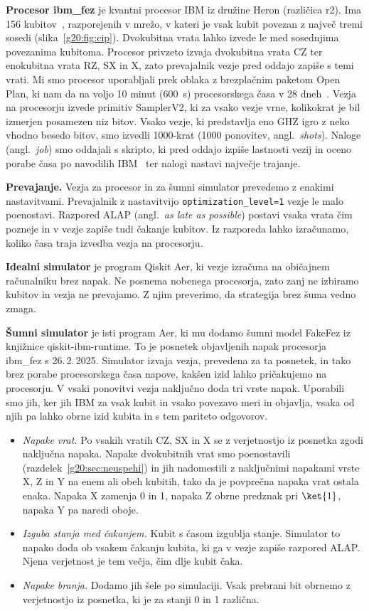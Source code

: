 \textbf{Procesor ibm\_fez} je kvantni procesor IBM iz družine Heron (različica r2). Ima 156 kubitov~\cite{g20:ibmprocessors}, razporejenih v mrežo, v kateri je vsak kubit povezan z največ tremi sosedi (slika~\ref{g20:fig:cip}). Dvokubitna vrata lahko izvede le med sosednjima povezanima kubitoma. Procesor privzeto izvaja dvokubitna vrata CZ ter enokubitna vrata RZ, SX in X, zato prevajalnik vezje pred oddajo zapiše s temi vrati. Mi smo procesor uporabljali prek oblaka z brezplačnim paketom Open Plan, ki nam da na voljo 10 minut (600~s) procesorskega časa v 28 dneh~\cite{g20:ibmplan}. Vezja na procesorju izvede primitiv SamplerV2, ki za vsako vezje vrne, kolikokrat je bil izmerjen posamezen niz bitov. Vsako vezje, ki predstavlja eno GHZ igro z neko vhodno besedo bitov, smo izvedli 1000-krat (1000 ponovitev, angl.\ \emph{shots}). Naloge (angl.\ \emph{job}) smo oddajali s skripto, ki pred oddajo izpiše lastnosti vezij in oceno porabe časa po navodilih IBM~\cite{g20:ibmjobtime} ter nalogi nastavi največje trajanje.

\textbf{Prevajanje.} Vezja za procesor in za šumni simulator prevedemo z enakimi nastavitvami. Prevajalnik z nastavitvijo \texttt{optimization\_level=1} vezje le malo poenostavi. Razpored ALAP (angl.\ \emph{as late as possible}) postavi vsaka vrata čim pozneje in v vezje zapiše tudi čakanje kubitov. Iz razporeda lahko izračunamo, koliko časa traja izvedba vezja na procesorju.

\textbf{Idealni simulator} je program Qiskit Aer, ki vezje izračuna na običajnem računalniku brez napak. Ne posnema nobenega procesorja, zato zanj ne izbiramo kubitov in vezja ne prevajamo. Z njim preverimo, da strategija brez šuma vedno zmaga.

\textbf{Šumni simulator} je isti program Aer, ki mu dodamo šumni model FakeFez iz knjižnice qiskit-ibm-runtime. To je posnetek objavljenih napak procesorja ibm\_fez s 26.\,2.\,2025. Simulator izvaja vezja, prevedena za ta posnetek, in tako brez porabe procesorskega časa napove, kakšen izid lahko pričakujemo na procesorju. V vsaki ponovitvi vezja naključno doda tri vrste napak. Uporabili smo jih, ker jih IBM za vsak kubit in vsako povezavo meri in objavlja, vsaka od njih pa lahko obrne izid kubita in s tem pariteto odgovorov.
\begin{itemize}
\item \emph{Napake vrat.} Po vsakih vratih CZ, SX in X se z verjetnostjo iz posnetka zgodi naključna napaka. Napake dvokubitnih vrat smo poenostavili (razdelek~\ref{g20:sec:neuspehi}) in jih nadomestili z naključnimi napakami vrste X, Z in Y na enem ali obeh kubitih, tako da je povprečna napaka vrat ostala enaka. Napaka X zamenja 0 in 1, napaka Z obrne predznak pri $\ket{1}$, napaka Y pa naredi oboje.
\item \emph{Izguba stanja med čakanjem.} Kubit s časom izgublja stanje. Simulator to napako doda ob vsakem čakanju kubita, ki ga v vezje zapiše razpored ALAP. Njena verjetnost je tem večja, čim dlje kubit čaka.
\item \emph{Napake branja.} Dodamo jih šele po simulaciji. Vsak prebrani bit obrnemo z verjetnostjo iz posnetka, ki je za stanji 0 in 1 različna.
\end{itemize}

